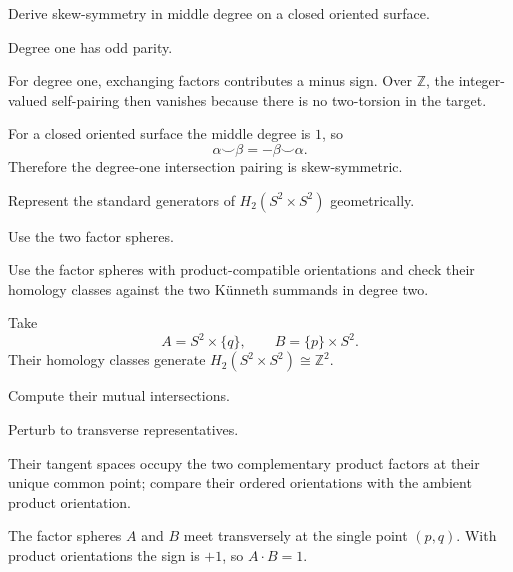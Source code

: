 \begin{exercise}\label{exr:viii34-16}
Derive skew-symmetry in middle degree on a closed oriented surface.
\end{exercise}
\begin{hint}
Degree one has odd parity.

For degree one, exchanging factors contributes a minus sign. Over \(\mathbb Z\), the integer-valued self-pairing then vanishes because there is no two-torsion in the target.
\end{hint}
\begin{solution}
For a closed oriented surface the middle degree is \(1\), so
\[
\alpha\smile\beta=-\beta\smile\alpha.
\]
Therefore the degree-one intersection pairing is skew-symmetric.
\end{solution}

\begin{exercise}\label{exr:viii34-17}
Represent the standard generators of $H_2(S^2\times S^2)$ geometrically.
\end{exercise}
\begin{hint}
Use the two factor spheres.

Use the factor spheres with product-compatible orientations and check their homology classes against the two Künneth summands in degree two.
\end{hint}
\begin{solution}
Take
\[
A=S^2\times\{q\},\qquad B=\{p\}\times S^2.
\]
Their homology classes generate \(H_2(S^2\times S^2)\cong\mathbb Z^2\).
\end{solution}

\begin{exercise}\label{exr:viii34-18}
Compute their mutual intersections.
\end{exercise}
\begin{hint}
Perturb to transverse representatives.

Their tangent spaces occupy the two complementary product factors at their unique common point; compare their ordered orientations with the ambient product orientation.
\end{hint}
\begin{solution}
The factor spheres \(A\) and \(B\) meet transversely at the single point \((p,q)\). With product orientations the sign is \(+1\), so \(A\cdot B=1\).
\end{solution}

